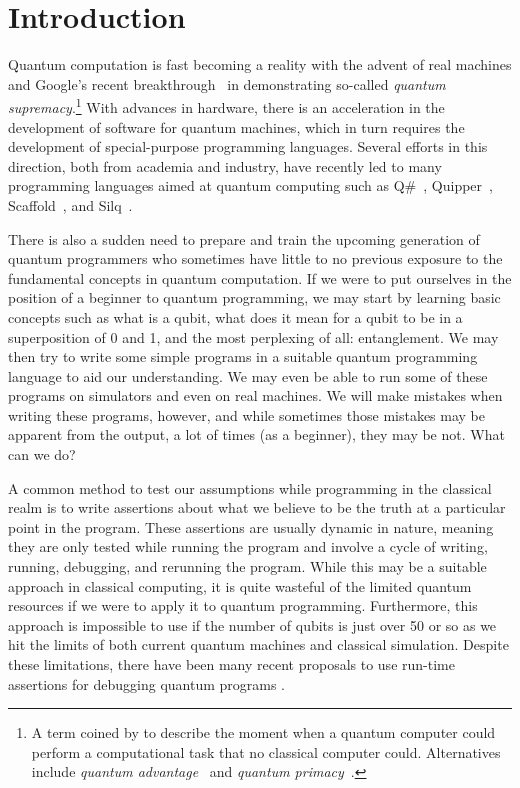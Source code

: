 \listoftables

\listoffigures

\lstlistoflistings


\section{Introduction}

Quantum computation is fast becoming a reality with the advent of real machines and Google's recent breakthrough~\parencite{supremacy19} in demonstrating so-called \textit{quantum supremacy}.\footnote{A term coined by \textcite{Preskill2012} to describe the moment when a quantum computer could perform a computational task that no classical computer could. Alternatives include \textit{quantum advantage}~\parencite{nature-advantage2019} and \textit{quantum primacy}~\parencite{durham2021}.} With advances in hardware, there is an acceleration in the development of software for quantum machines, which in turn requires the development of special-purpose programming languages. Several efforts in this direction, both from academia and industry, have recently led to many programming languages aimed at quantum computing such as Q\#~\parencite{qsharp2018}, Quipper~\parencite{quipper2013}, Scaffold~\parencite{scaffold12}, and Silq~\parencite{silq20}.

There is also a sudden need to prepare and train the upcoming generation of quantum programmers who sometimes have little to no previous exposure to the fundamental concepts in quantum computation. If we were to put ourselves in the position of a beginner to quantum programming, we may start by learning basic concepts such as what is a qubit, what does it mean for a qubit to be in a superposition of 0 and 1, and the most perplexing of all: entanglement. We may then try to write some simple programs in a suitable quantum programming language to aid our understanding. We may even be able to run some of these programs on simulators and even on real machines. We will make mistakes when writing these programs, however, and while sometimes those mistakes may be apparent from the output, a lot of times (as a beginner), they may be not. What can we do?

A common method to test our assumptions while programming in the classical realm is to write assertions about what we believe to be the truth at a particular point in the program. These assertions are usually dynamic in nature, meaning they are only tested while running the program and involve a cycle of writing, running, debugging, and rerunning the program. While this may be a suitable approach in classical computing, it is quite wasteful of the limited quantum resources if we were to apply it to quantum programming. Furthermore, this approach is impossible to use if the number of qubits is just over 50 or so as we hit the limits of both current quantum machines and classical simulation. Despite these limitations, there have been many recent proposals to use run-time assertions for debugging quantum programs \parencite{Li2020,huang2019}.

